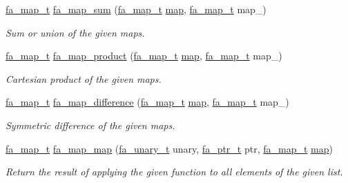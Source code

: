 \begin{DoxyCompactItemize}
\hyperlink{group___fa_map_gadcbb0c425af31be6aeb265159b2a7db0}{fa\-\_\-map\-\_\-t} \hyperlink{group___fa_map_gaf80408d1f455d54c3fd3d6a85e63850d}{fa\-\_\-map\-\_\-sum} (\hyperlink{group___fa_map_gadcbb0c425af31be6aeb265159b2a7db0}{fa\-\_\-map\-\_\-t} \hyperlink{literals_8h_a44305f0bc81207be0dcc90650733e331}{map}, \hyperlink{group___fa_map_gadcbb0c425af31be6aeb265159b2a7db0}{fa\-\_\-map\-\_\-t} map\-\_\-)
\begin{DoxyCompactList}\small\item\em Sum or union of the given maps. \end{DoxyCompactList}\item 
\hyperlink{group___fa_map_gadcbb0c425af31be6aeb265159b2a7db0}{fa\-\_\-map\-\_\-t} \hyperlink{group___fa_map_ga334ae2424a14e058580286645ee0aaf4}{fa\-\_\-map\-\_\-product} (\hyperlink{group___fa_map_gadcbb0c425af31be6aeb265159b2a7db0}{fa\-\_\-map\-\_\-t} \hyperlink{literals_8h_a44305f0bc81207be0dcc90650733e331}{map}, \hyperlink{group___fa_map_gadcbb0c425af31be6aeb265159b2a7db0}{fa\-\_\-map\-\_\-t} map\-\_\-)
\begin{DoxyCompactList}\small\item\em Cartesian product of the given maps. \end{DoxyCompactList}\item 
\hyperlink{group___fa_map_gadcbb0c425af31be6aeb265159b2a7db0}{fa\-\_\-map\-\_\-t} \hyperlink{group___fa_map_gaa957b7099132ca05f5cd719699d3117c}{fa\-\_\-map\-\_\-difference} (\hyperlink{group___fa_map_gadcbb0c425af31be6aeb265159b2a7db0}{fa\-\_\-map\-\_\-t} \hyperlink{literals_8h_a44305f0bc81207be0dcc90650733e331}{map}, \hyperlink{group___fa_map_gadcbb0c425af31be6aeb265159b2a7db0}{fa\-\_\-map\-\_\-t} map\-\_\-)
\begin{DoxyCompactList}\small\item\em Symmetric difference of the given maps. \end{DoxyCompactList}\item 
\hyperlink{group___fa_map_gadcbb0c425af31be6aeb265159b2a7db0}{fa\-\_\-map\-\_\-t} \hyperlink{group___fa_map_gaa2ddc5a471acd60dccd6b130d7bad863}{fa\-\_\-map\-\_\-map} (\hyperlink{group___fa_gaaafae8ab9ebae9019133108e56d2d4d1}{fa\-\_\-unary\-\_\-t} unary, \hyperlink{group___fa_ga915ddeae99ad7568b273d2b876425197}{fa\-\_\-ptr\-\_\-t} ptr, \hyperlink{group___fa_map_gadcbb0c425af31be6aeb265159b2a7db0}{fa\-\_\-map\-\_\-t} \hyperlink{literals_8h_a44305f0bc81207be0dcc90650733e331}{map})
\begin{DoxyCompactList}\small\item\em Return the result of applying the given function to all elements of the given list. \end{DoxyCompactList}\item 

\end{DoxyCompactItemize}
